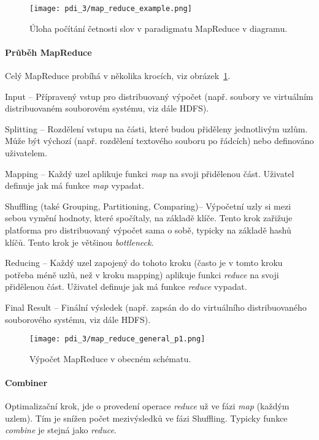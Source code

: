 \begin{figure}[H]
    \centering
    \texttt{[image: pdi\_3/map\_reduce\_example.png]}
    \caption{Úloha počítání četnosti slov v paradigmatu MapReduce v diagramu.}
    \label{49_map_reduce_example}
\end{figure}

\paragraph*{Průběh MapReduce} Celý MapReduce probíhá v několika krocích, viz obrázek~\ref{49_map_reduce_example}.
\begin{compactenum}
    \item Input -- Přípravený vstup pro distribuovaný výpočet (např. soubory ve virtuálním distribuovaném souborovém systému, viz dále HDFS).
    \item Splitting -- Rozdělení vstupu na části, které budou přiděleny jednotlivým uzlům. Může být výchozí (např. rozdělení textového souboru po řádcích) nebo definováno uživatelem.
    \item Mapping -- Každý uzel aplikuje funkci \textit{map} na svoji přidělenou část. Uživatel definuje jak má funkce \textit{map} vypadat.
    \item Shuffling (také Grouping, Partitioning, Comparing)-- Výpočetní uzly si mezi sebou vymění hodnoty, které spočítaly, na základě klíče. Tento krok zařižuje platforma pro distribuovaný výpočet sama o sobě, typicky na základě hashů klíčů. Tento krok je většinou \textit{bottleneck}.
    \item Reducing -- Každý uzel zapojený do tohoto kroku (často je v tomto kroku potřeba méně uzlů, než v kroku mapping) aplikuje funkci \textit{reduce} na svoji přidělenou část. Uživatel definuje jak má funkce \textit{reduce} vypadat.
    \item Final Result -- Finální výsledek (např. zapsán do do virtuálního distribuovaného souborového systému, viz dále HDFS).
\end{compactenum}

\begin{figure}[H]
    \centering
    \texttt{[image: pdi\_3/map\_reduce\_general\_p1.png]}
    \caption{Výpočet MapReduce v obecném schématu.}
\end{figure}

\paragraph*{Combiner} Optimalizační krok, jde o  provedení operace \textit{reduce} už ve fázi \textit{map} (každým uzlem). Tím je snížen počet mezivýsledků ve fázi Shuffling. Typicky funkce \textit{combine} je stejná jako \textit{reduce}.

